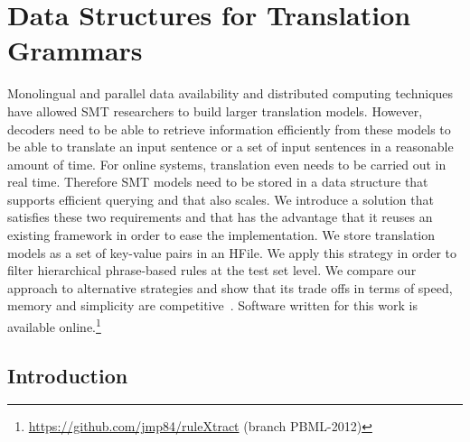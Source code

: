 \chapter{Data Structures for Translation Grammars}
\label{chap:hfile}


Monolingual and parallel data availability and distributed computing techniques
have allowed SMT
researchers to build larger translation models. However, decoders need to be
able to retrieve information efficiently from these models to be able to
translate an input sentence or a set of input sentences in a reasonable amount
of time. For online systems, translation even needs to be carried out in
real time. Therefore SMT models need to be stored in a data structure
that supports efficient querying and that also scales. We introduce a solution
that satisfies these two requirements and that has the advantage that
it reuses an existing framework in order to ease the implementation.
We store translation models as a set of key-value pairs in an HFile. We apply this
strategy in order to filter hierarchical phrase-based rules at the test set level. We compare our
approach to alternative strategies and show that its trade offs in terms
of speed, memory and simplicity are
competitive~\citep{pino-waite-byrne:2012:PBML}. Software written for this work
is available online.\footnote{\url{https://github.com/jmp84/ruleXtract} (branch PBML-2012)}

\section{Introduction}


